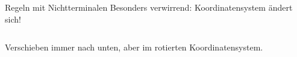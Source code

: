 \documentclass{beamer}
\theoremstyle{example}
\begin{document}
\begin{frame}{Regeln mit Nichtterminalen}
  Besonders verwirrend: Koordinatensystem ändert sich!
\begin{columns}
\column{6cm}

\column{4cm}
\begin{center}
\end{center}
\end{columns}\medskip
Verschieben immer nach unten, aber im rotierten Koordinatensystem.
\end{frame}
\end{document}
